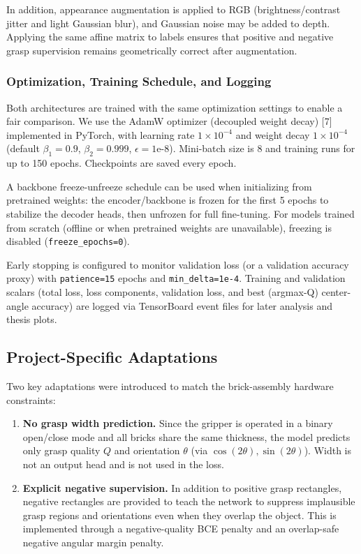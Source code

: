 In addition, appearance augmentation is applied to RGB (brightness/contrast jitter and light Gaussian blur), and Gaussian noise may be added to depth. Applying the same affine matrix to labels ensures that positive and negative grasp supervision remains geometrically correct after augmentation.

\subsubsection{Optimization, Training Schedule, and Logging}
Both architectures are trained with the same optimization settings to enable a fair comparison. We use the AdamW optimizer (decoupled weight decay) [7] implemented in PyTorch, with learning rate $1 \times 10^{-4}$ and weight decay $1 \times 10^{-4}$ (default $\beta_1=0.9$, $\beta_2=0.999$, $\epsilon=1\text{e-}8$). Mini-batch size is 8 and training runs for up to 150 epochs. Checkpoints are saved every epoch.

A backbone freeze-unfreeze schedule can be used when initializing from pretrained weights: the encoder/backbone is frozen for the first 5 epochs to stabilize the decoder heads, then unfrozen for full fine-tuning. For models trained from scratch (offline or when pretrained weights are unavailable), freezing is disabled (\texttt{freeze\_epochs=0}).

Early stopping is configured to monitor validation loss (or a validation accuracy proxy) with \texttt{patience=15} epochs and \texttt{min\_delta=1e-4}. Training and validation scalars (total loss, loss components, validation loss, and best (argmax-Q) center-angle accuracy) are logged via TensorBoard event files for later analysis and thesis plots.


\subsection{Project-Specific Adaptations}
Two key adaptations were introduced to match the brick-assembly hardware constraints:

\begin{enumerate}
    \item \textbf{No grasp width prediction.} Since the gripper is operated in a binary open/close mode and all bricks share the same thickness, the model predicts only grasp quality $Q$ and orientation $\theta$ (via $\cos(2\theta), \sin(2\theta)$). Width is not an output head and is not used in the loss.
    
    \item \textbf{Explicit negative supervision.} In addition to positive grasp rectangles, negative rectangles are provided to teach the network to suppress implausible grasp regions and orientations even when they overlap the object. This is implemented through a negative-quality BCE penalty and an overlap-safe negative angular margin penalty.
\end{enumerate}

